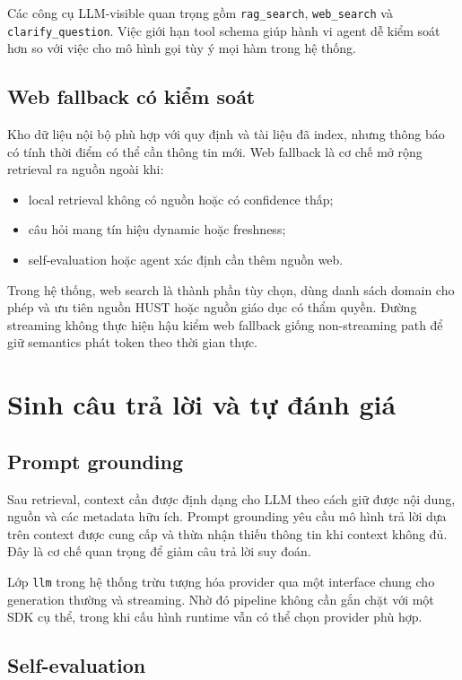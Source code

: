 \documentclass[../DoAn.tex]{subfiles}
\begin{document}
Các công cụ LLM-visible quan trọng gồm \texttt{rag\_search},
\texttt{web\_search} và \texttt{clarify\_question}. Việc giới hạn tool schema
giúp hành vi agent dễ kiểm soát hơn so với việc cho mô hình gọi tùy ý mọi hàm
trong hệ thống.

\subsection{Web fallback có kiểm soát}

Kho dữ liệu nội bộ phù hợp với quy định và tài liệu đã index, nhưng thông báo có
tính thời điểm có thể cần thông tin mới. Web fallback là cơ chế mở rộng retrieval
ra nguồn ngoài khi:

\begin{itemize}
    \item local retrieval không có nguồn hoặc có confidence thấp;
    \item câu hỏi mang tín hiệu dynamic hoặc freshness;
    \item self-evaluation hoặc agent xác định cần thêm nguồn web.
\end{itemize}

Trong hệ thống, web search là thành phần tùy chọn, dùng danh sách domain cho phép
và ưu tiên nguồn HUST hoặc nguồn giáo dục có thẩm quyền. Đường streaming không
thực hiện hậu kiểm web fallback giống non-streaming path để giữ semantics phát
token theo thời gian thực.

\section{Sinh câu trả lời và tự đánh giá}

\subsection{Prompt grounding}

Sau retrieval, context cần được định dạng cho LLM theo cách giữ được nội dung,
nguồn và các metadata hữu ích. Prompt grounding yêu cầu mô hình trả lời dựa trên
context được cung cấp và thừa nhận thiếu thông tin khi context không đủ. Đây là
cơ chế quan trọng để giảm câu trả lời suy đoán.

Lớp \texttt{llm} trong hệ thống trừu tượng hóa provider qua một interface chung
cho generation thường và streaming. Nhờ đó pipeline không cần gắn chặt với một
SDK cụ thể, trong khi cấu hình runtime vẫn có thể chọn provider phù hợp.

\subsection{Self-evaluation}
\end{document}
